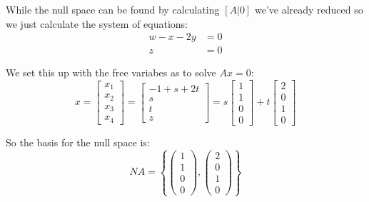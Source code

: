 While the null space can be found by calculating $[A|0]$ we've already reduced so we just calculate the system of equations:
\begin{align*}
	w-x-2y & = 0 \\
	z      & = 0
\end{align*}

We set this up with the free variabes as to solve $Ax=0$:
\[
	x = \begin{bmatrix}x_1\\x_2\\x_3\\x_4\end{bmatrix}=\begin{bmatrix}-1+s + 2t\\s\\t\\z\end{bmatrix}=s\begin{bmatrix}1\\1\\0\\0\end{bmatrix}+t\begin{bmatrix}2\\0\\1\\0\end{bmatrix}
\]

So the basis for the null space is:
\[
	NA = \left\{\begin{pmatrix}1\\1\\0\\0\end{pmatrix}, \begin{pmatrix}2\\0\\1\\0\end{pmatrix}\right\}
\]
